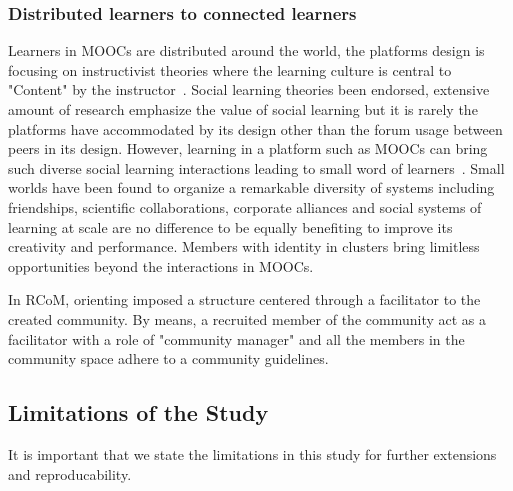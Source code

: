 \documentclass[format=acmsmall, review=false, screen=true]{acmart}
\begin{document}
\subsubsection {Distributed learners to connected learners} 
Learners in MOOCs are distributed around the world, the platforms design is focusing on instructivist theories where the learning culture is central to "Content" by the instructor~\cite{crosslin2016instructivism}. Social learning theories been endorsed, extensive amount of research emphasize the value of social learning but it is rarely the platforms have accommodated by its design other than the forum usage between peers in its design. However, learning in a platform such as MOOCs can bring such diverse social learning interactions leading to small word of learners~\cite{watts1999networks}. Small worlds have been found to organize a remarkable diversity of systems including friendships, scientific collaborations, corporate alliances and social systems of learning at scale are no difference to be equally benefiting to improve its creativity and performance. Members with identity in clusters bring limitless opportunities beyond the interactions in MOOCs. 


In RCoM, orienting imposed a structure centered through a facilitator to the created community. By means, a recruited member of the community act as a facilitator with a role of "community manager" and all the members in the community space adhere to a community guidelines. 

\subsection{Limitations of the Study}
It is important that we state the limitations in this study for further extensions and reproducability. 
\end{document}
